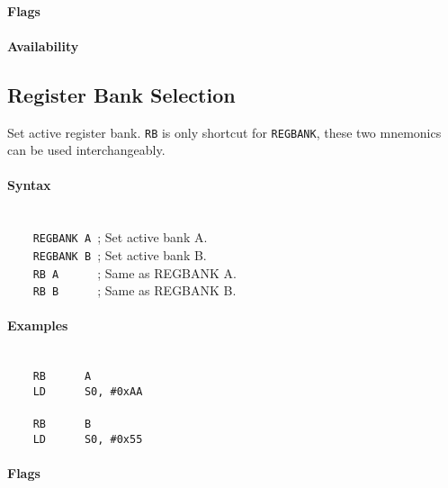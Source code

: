         \paragraph{Flags}

        \paragraph{Availability}
            \pbavailability{\yes}{\yes}{\yes}{\yes}{\yes}

\clearpage
\subsection{Register Bank Selection}
        Set active register bank. \texttt{RB} is only shortcut for \texttt{REGBANK}, these two mnemonics can be used interchangeably.
        \paragraph{Syntax}
            ~\\
            \verb'    REGBANK A '; Set active bank A.\\
            \verb'    REGBANK B '; Set active bank B.\\
            \verb'    RB A      '; Same as REGBANK A.\\
            \verb'    RB B      '; Same as REGBANK B.\\

        \paragraph{Examples}
            ~\\
            \verb'    RB      A'\\
            \verb'    LD      S0, #0xAA'\\
            \verb''\\
            \verb'    RB      B'\\
            \verb'    LD      S0, #0x55'

        \paragraph{Flags}

